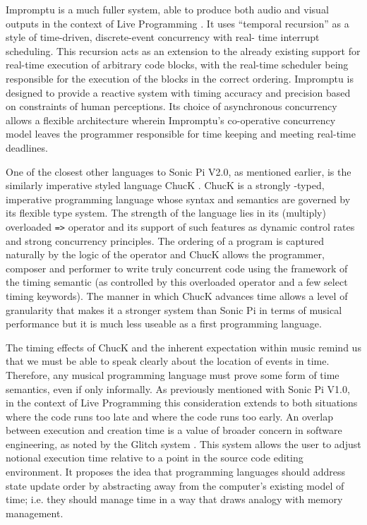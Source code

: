 \documentclass[11pt, abstracton, twoside, titlepage=true]{scrartcl}
\begin{document}
Impromptu is a much fuller system, able to produce both audio and visual 
outputs in the context of Live Programming \cite{SG10}. It uses ``temporal 
recursion'' as a style of time-driven, discrete-event concurrency with real-
time interrupt scheduling. This recursion acts as an extension to the already 
existing support for real-time execution of arbitrary code blocks, with the 
real-time scheduler being responsible for the execution of the blocks in the 
correct ordering. Impromptu is designed to provide a reactive system with 
timing accuracy and precision based on constraints of human perceptions. Its 
choice of asynchronous concurrency allows a flexible architecture wherein 
Impromptu's co-operative concurrency model leaves the programmer responsible 
for time keeping and meeting real-time deadlines.

One of the closest other languages to Sonic Pi V2.0, as mentioned earlier, is 
the similarly imperative styled language ChucK \cite{WC03}. ChucK is a strongly
-typed, imperative programming language whose syntax and semantics are 
governed by its flexible type system. The strength of the language lies in its 
(multiply) overloaded \texttt{=>} operator and its support of such features as 
dynamic control rates and strong concurrency principles. The ordering of a 
program is captured naturally by the logic of the operator and ChucK allows 
the programmer, composer and performer to write truly concurrent code using 
the framework of the timing semantic (as controlled by this overloaded 
operator and a few select timing keywords). The manner in which ChucK advances 
time allows a level of granularity that makes it a stronger system than Sonic 
Pi in terms of musical performance but it is much less useable as a first 
programming language.

The timing effects of ChucK and the inherent expectation within music remind 
us that we must be able to speak clearly about the location of events in time. 
Therefore, any musical programming language must prove some form of time 
semantics, even if only informally. As previously mentioned with Sonic Pi 
V1.0, in the context of Live Programming this consideration extends to both 
situations where the code runs too late and where the code runs too early. An 
overlap between execution and creation time is a value of broader concern in 
software engineering, as noted by the Glitch system \cite{ME14}. This system 
allows the user to adjust notional execution time relative to a point in the 
source code editing environment. It proposes the idea that programming 
languages should address state update order by abstracting away from the 
computer's existing model of time; i.e. they should manage time in a way that 
draws analogy with memory management. 
\end{document}

